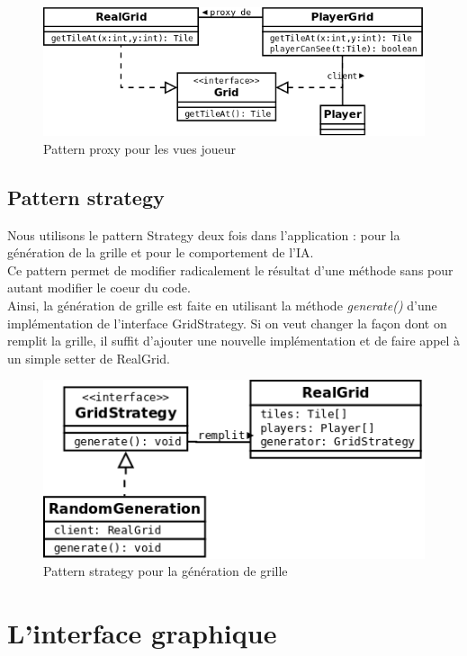 \documentclass[a4paper,12pt]{article} %
\begin{document}
\begin{figure}[!h]
\centering
\includegraphics[scale=0.3]{images/proxy.png}
\caption{Pattern proxy pour les vues joueur}
\end{figure}

\subsection{Pattern strategy}

Nous utilisons le pattern Strategy deux fois dans l'application : pour la génération de la grille et pour le comportement de l'IA.\\
Ce pattern permet de modifier radicalement le résultat d'une méthode sans pour autant modifier le coeur du code.\\
Ainsi, la génération de grille est faite en utilisant la méthode \textit{generate()} d'une implémentation de l'interface GridStrategy. Si on veut changer la façon dont on remplit la grille, il suffit d'ajouter une nouvelle implémentation et de faire appel à un simple setter de RealGrid.

\begin{figure}[!h]
\centering
\includegraphics[scale=0.5]{images/strategy.png}
\caption{Pattern strategy pour la génération de grille}
\end{figure}


\section{L'interface graphique}
\end{document}
